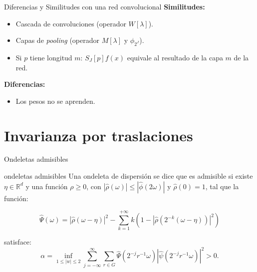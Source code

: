 \documentclass[aspectratio=43]{beamer}
\begin{document}
\begin{frame}{Diferencias y Similitudes con una red convolucional}
  \textbf{\textcolor{tudCyan}{Similitudes:}}
  \begin{itemize}
    \item Cascada de convoluciones (operador $W[\lambda]$).
    \item Capas de \textit{pooling} (operador $M[\lambda]$ y $\phi_{2^J}$).
    \item Si $p$ tiene longitud $m$: $S_J[p]f(x)$ equivale al resultado de la capa $m$ de la red.
  \end{itemize}

  \textbf{\textcolor{tudCyan}{Diferencias:}}
  \begin{itemize}
    \item Los pesos no se aprenden.
  \end{itemize}
\end{frame}

\section{Invarianza por traslaciones}

\begin{frame}{Ondeletas admisibles}

  \begin{block}{ondeletas admisibles}
    Una ondeleta de dispersión se dice que es admisible si existe $\eta \in \mathbb{R}^d$ y una función $\rho \geq 0$, con $|\widehat{\rho}(\omega)| \leq |\widehat{\phi}(2\omega)|$ y $\widehat{\rho}(0)=1$, tal que la función:

    \begin{equation*}\label{eq::1.6}
      \widehat{\Psi}(\omega)=|\widehat{\rho}(\omega - \eta)|^2 - \sum_{k=1}^{+\infty} k(1-|\widehat{\rho}(2^{-k}(\omega - \eta))|^2)
    \end{equation*}

    \noindent satisface:
    \begin{equation*} \label{eq::1.7}
      \alpha= \inf_{1\leq|w|\leq2} \sum_{j=-\infty}^{\infty} \sum_{r\in G} \widehat{\Psi} (2^{-j}r^{-1}\omega)|\widehat{\psi}(2^{-j}r^{-1}\omega)|^2>0.
    \end{equation*}
  \end{block}


\end{frame}
\end{document}
